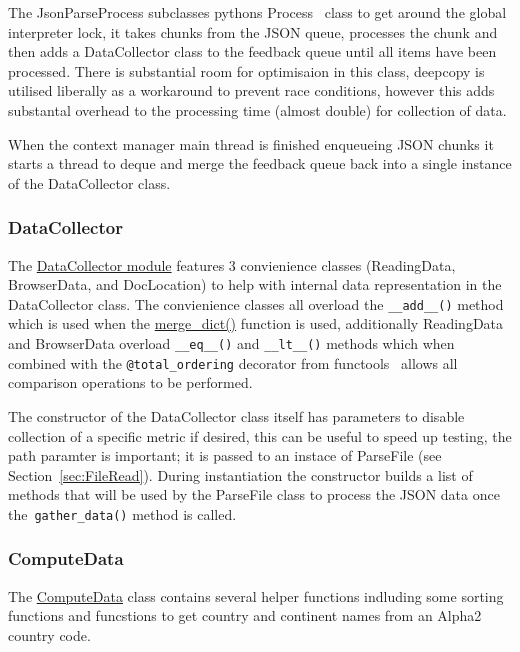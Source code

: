 \documentclass[11pt]{article}
\newcommand{\code}[1]{\colorbox{light-gray}{\texttt{#1}}}
\begin{document}
The JsonParseProcess subclasses pythons Process~\autocite{MultiprocessingProcessbasedParallelism} class to get around the global interpreter lock, it takes chunks from the JSON queue, processes the chunk and then adds a DataCollector class to the feedback queue until all items have been processed. 
There is substantial room for optimisaion in this class, deepcopy is utilised liberally as a workaround to prevent race conditions, however this adds substantal overhead to the processing time (almost double) for collection of data.

When the context manager main thread is finished enqueueing JSON chunks it starts a thread to deque and merge the feedback queue back into a single instance of the DataCollector class.

\subsubsection{DataCollector}
The \href{https://www2.macs.hw.ac.uk/~sf52/DocuTrace/html/DocuTrace.Analysis.html#module-DocuTrace.Analysis.DataCollector}{DataCollector module} features 3 convienience classes (ReadingData, BrowserData, and DocLocation) to help with internal data representation in the DataCollector class. The convienience classes all overload the \code{\_\_add\_\_()} method which is used when the \href{https://www2.macs.hw.ac.uk/~sf52/DocuTrace/html/DocuTrace.Analysis.html#DocuTrace.Analysis.DataCollector.merge_dict}{merge\_dict()} function is used, additionally ReadingData and BrowserData overload \code{\_\_eq\_\_()} and \code{\_\_lt\_\_()} methods which when combined with the \code{@total\_ordering} decorator from functools~\autocite{FunctoolsHigherorderFunctions} allows all comparison operations to be performed.

The constructor of the DataCollector class itself has parameters to disable collection of a specific metric if desired, this can be useful to speed up testing, the path paramter is important; it is passed to an instace of ParseFile (see Section~\ref{sec:FileRead}). During instantiation the constructor builds a list of methods that will be used by the ParseFile class to process the JSON data once the~\code{gather\_data()} method is called.

\subsubsection{ComputeData}
The \href{https://www2.macs.hw.ac.uk/~sf52/DocuTrace/html/DocuTrace.Analysis.html#module-DocuTrace.Analysis.ComputeData}{ComputeData} class contains several helper functions indluding some sorting functions and funcstions to get country and continent names from an Alpha2 country code.
\end{document}
